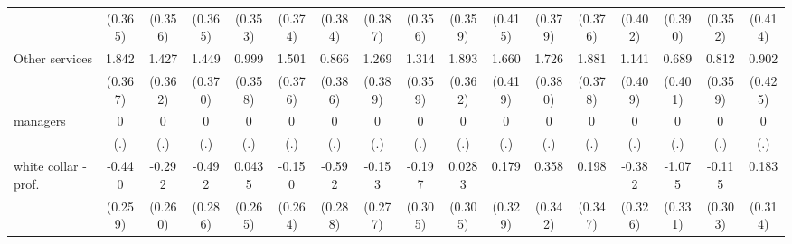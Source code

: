 {\begin{tabular}{l*{16}{c}}
                    &     (0.365)         &     (0.356)         &     (0.365)         &     (0.353)         &     (0.374)         &     (0.384)         &     (0.387)         &     (0.356)         &     (0.359)         &     (0.415)         &     (0.379)         &     (0.376)         &     (0.402)         &     (0.390)         &     (0.352)         &     (0.414)         \\
[1em]
Other services      &       1.842\sym{***}&       1.427\sym{***}&       1.449\sym{***}&       0.999\sym{**} &       1.501\sym{***}&       0.866\sym{*}  &       1.269\sym{**} &       1.314\sym{***}&       1.893\sym{***}&       1.660\sym{***}&       1.726\sym{***}&       1.881\sym{***}&       1.141\sym{**} &       0.689         &       0.812\sym{*}  &       0.902\sym{*}  \\
                    &     (0.367)         &     (0.362)         &     (0.370)         &     (0.358)         &     (0.376)         &     (0.386)         &     (0.389)         &     (0.359)         &     (0.362)         &     (0.419)         &     (0.380)         &     (0.378)         &     (0.409)         &     (0.401)         &     (0.359)         &     (0.425)         \\
[1em]
managers            &           0         &           0         &           0         &           0         &           0         &           0         &           0         &           0         &           0         &           0         &           0         &           0         &           0         &           0         &           0         &           0         \\
                    &         (.)         &         (.)         &         (.)         &         (.)         &         (.)         &         (.)         &         (.)         &         (.)         &         (.)         &         (.)         &         (.)         &         (.)         &         (.)         &         (.)         &         (.)         &         (.)         \\
[1em]
white collar - prof.&      -0.440         &      -0.292         &      -0.492         &      0.0435         &      -0.150         &      -0.592\sym{*}  &      -0.153         &      -0.197         &      0.0283         &       0.179         &       0.358         &       0.198         &      -0.382         &      -1.075\sym{**} &      -0.115         &       0.183         \\
                    &     (0.259)         &     (0.260)         &     (0.286)         &     (0.265)         &     (0.264)         &     (0.288)         &     (0.277)         &     (0.305)         &     (0.305)         &     (0.329)         &     (0.342)         &     (0.347)         &     (0.326)         &     (0.331)         &     (0.303)         &     (0.314)         \\

\end{tabular}}

